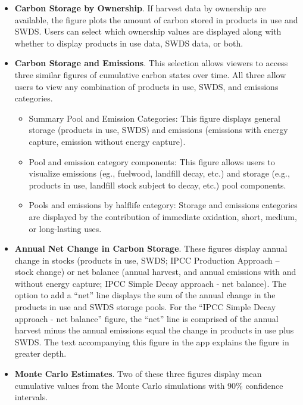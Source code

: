\documentclass[
  openany]{book}
\providecommand{\tightlist}{%
  \setlength{\itemsep}{0pt}\setlength{\parskip}{0pt}}
\begin{document}
\begin{itemize}
\item
  \textbf{Carbon Storage by Ownership}. If harvest data by ownership are available, the figure plots the amount of carbon stored in products in use and SWDS. Users can select which ownership values are displayed along with whether to display products in use data, SWDS data, or both.\\
\item
  \textbf{Carbon Storage and Emissions}. This selection allows viewers to access three similar figures of cumulative carbon states over time. All three allow users to view any combination of products in use, SWDS, and emissions categories.

  \begin{itemize}
  \tightlist
  \item
    Summary Pool and Emission Categories: This figure displays general storage (products in use, SWDS) and emissions (emissions with energy capture, emission without energy capture).
  \item
    Pool and emission category components: This figure allows users to visualize emissions (eg., fuelwood, landfill decay, etc.) and storage (e.g., products in use, landfill stock subject to decay, etc.) pool components.
  \item
    Pools and emissions by halflife category: Storage and emissions categories are displayed by the contribution of immediate oxidation, short, medium, or long-lasting uses.\\
  \end{itemize}
\item
  \textbf{Annual Net Change in Carbon Storage}. These figures display annual change in stocks (products in use, SWDS; IPCC Production Approach -- stock change) or net balance (annual harvest, and annual emissions with and without energy capture; IPCC Simple Decay approach - net balance). The option to add a ``net'' line displays the sum of the annual change in the products in use and SWDS storage pools. For the ``IPCC Simple Decay approach - net balance'' figure, the ``net'' line is comprised of the annual harvest minus the annual emissions equal the change in products in use plus SWDS. The text accompanying this figure in the app explains the figure in greater depth.
\item
  \textbf{Monte Carlo Estimates}. Two of these three figures display mean cumulative values from the Monte Carlo simulations with 90\% confidence intervals.


\end{itemize}
\end{document}
